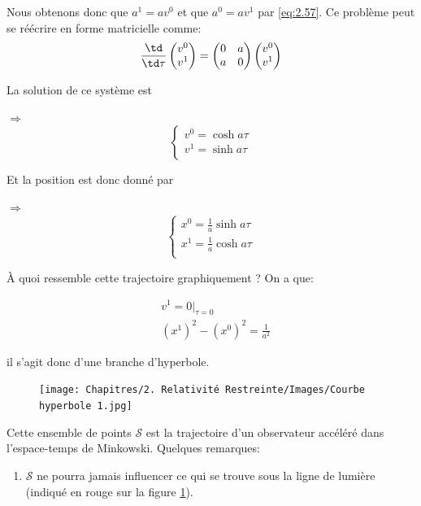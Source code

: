 \begin{exmp}
Nous obtenons donc que $a^1 = av^{0}$ et que $a^0 = av^{1}$ par \ref{eq:2.57}. Ce problème peut se réécrire en forme matricielle comme:
\begin{equation}
\frac{\td }{\td \tau} \begin{pmatrix}
    v^0 \\
    v^1
\end{pmatrix} = \begin{pmatrix}
    0 & a \\
    a & 0
\end{pmatrix}
\begin{pmatrix}
    v^0 \\
    v^1
\end{pmatrix}
\end{equation} 

La solution de ce système est

$\Rightarrow $\begin{equation*} \left\{
\begin{array}{l}
  v^{0} = \cosh{a\tau}\\
 v^{1} = \sinh{a\tau}\\
\end{array}
\right.
\end{equation*}

Et la position est donc donné par

$\Rightarrow $\begin{equation*} \left\{
\begin{array}{l}
  x^{0} = \frac{1}{a}\sinh{a\tau}\\
 x^{1} = \frac{1}{a}\cosh{a\tau}\\
\end{array}
\right.
\end{equation*}

À quoi ressemble cette trajectoire graphiquement ? On a que:

\begin{align*}
    &v^{1} = 0|_{\tau = 0}\\
    &(x^1)^2 - (x^0)^2 = \frac{1}{a^2}
\end{align*}

il s'agit donc d'une branche d'hyperbole.
\begin{figure}[H]
    \centering
    \texttt{[image: Chapitres/2. Relativité Restreinte/Images/Courbe hyperbole 1.jpg]}
    \caption{}
    \label{fig:2.8}
\end{figure}

Cette ensemble de points $\mathcal{S}$ est la trajectoire d'un observateur accéléré dans l'espace-temps de Minkowski. Quelques remarques:
\begin{enumerate}
    \item $\mathcal{S}$ ne pourra jamais influencer ce qui se trouve sous la ligne de lumière  (indiqué en rouge sur la figure \ref{fig:2.8}). 


\end{enumerate}
\end{exmp}
